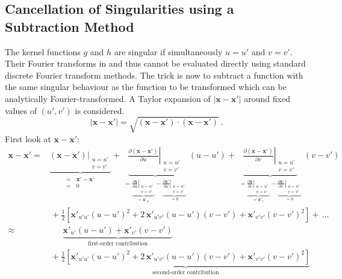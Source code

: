 \subsection{Cancellation of Singularities using a Subtraction Method}
The kernel functions $g$ and $h$ are singular if simultaneously $u=u'$ and $v=v'$.
Their Fourier transforms in  and  thus cannot be evaluated directly
using standard discrete Fourier transform methods.
The trick is now to subtract a function with the same singular behaviour as the function to be transformed
which can be analytically Fourier-transformed.
%
A Taylor expansion of $|\mathbf{x}-\mathbf{x}'|$ around fixed values of $(u',v')$ is considered.
\begin{equation}
  |\mathbf{x}-\mathbf{x}'| = \sqrt{ (\mathbf{x}-\mathbf{x}') \cdot (\mathbf{x}-\mathbf{x}') } \, . \label{eqn:dist_x_xprime}
\end{equation}
First look at $\mathbf{x}-\mathbf{x}'$:
\begin{align}
  \mathbf{x}-\mathbf{x}'
     =   &    \underbrace{ \left. (\mathbf{x}-\mathbf{x}') \right\rvert_{\substack{u=u'\\v=v'}} }_{
               \begin{aligned}=&\, \mathbf{x}'-\mathbf{x}' \\=&\, 0 \end{aligned} }
           + \underbrace{ \left. \frac{\partial(\mathbf{x}-\mathbf{x}')}{\partial u} \right\rvert_{\substack{u=u'\\v=v'}} }_{
               \begin{aligned}= \underbrace{\left. \frac{\partial \mathbf{x} }{\partial u}\right\rvert_{\substack{u=u'\\v=v'}}}_{=\mathbf{x}'_{u'}}
                              - \underbrace{\left. \frac{\partial \mathbf{x}'}{\partial u}\right\rvert_{\substack{u=u'\\v=v'}}}_{= 0} \end{aligned}} (u-u')
           + \underbrace{ \left. \frac{\partial(\mathbf{x}-\mathbf{x}')}{\partial v} \right\rvert_{\substack{u=u'\\v=v'}} }_{
               \begin{aligned}= \underbrace{\left. \frac{\partial \mathbf{x} }{\partial v}\right\rvert_{\substack{u=u'\\v=v'}}}_{=\mathbf{x}'_{v'}}
                              - \underbrace{\left. \frac{\partial \mathbf{x}'}{\partial v}\right\rvert_{\substack{u=u'\\v=v'}}}_{= 0} \end{aligned}} (v-v') \nonumber \\
    ~ &\,+ \frac{1}{2} \left[ \mathbf{x}'_{u' u'} (u-u')^2 + 2\, \mathbf{x}'_{u' v'} (u-u') (v-v') + \mathbf{x}'_{v' v'} (v-v')^2 \right] + \, ... \nonumber \\
  \approx&\, \phantom{+}~\underbrace{\mathbf{x}'_{u'} (u-u') + \mathbf{x}'_{v'} (v-v')}_{\textrm{first-order contribution}} \label{eqn:dist_1stOrder} \\
     ~   &\,          +  \underbrace{\frac{1}{2} \left[ \mathbf{x}'_{u' u'} (u-u')^2 + 2\, \mathbf{x}'_{u' v'} (u-u') (v-v') + \mathbf{x}'_{v' v'} (v-v')^2 \right]}_{\textrm{second-order contribution}} \label{eqn:dist_2ndOrder}
\end{align}
